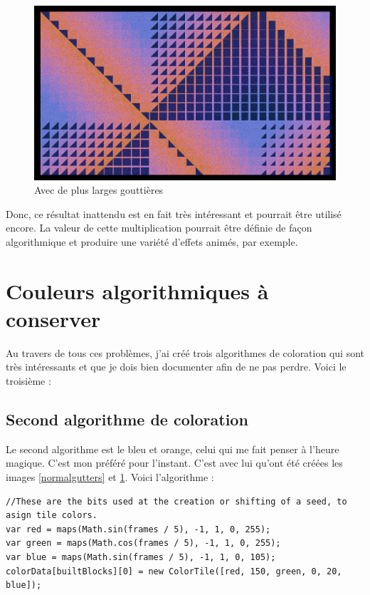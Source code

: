 \begin{figure}[h]
\includegraphics[width=1\textwidth]{images/pavage001.jpg}
\caption{Avec de plus larges gouttières}
\label{largegutters}
\end{figure}
Donc, ce résultat inattendu est en fait très intéressant et pourrait être utilisé encore. La valeur de cette multiplication pourrait être définie de façon algorithmique et produire une variété d'effets animés, par exemple.

\newpage
\section{Couleurs algorithmiques à conserver}
Au travers de tous ces problèmes, j'ai créé trois algorithmes de coloration qui sont très intéressants et que je dois bien documenter afin de ne pas perdre. Voici le troisième : 

\subsection{Second algorithme de coloration}
Le second algorithme est le bleu et orange, celui qui me fait penser à l'heure magique. C'est mon préféré pour l'instant. C'est avec lui qu'ont été créées les images \ref{normalgutters} et \ref{largegutters}. Voici l'algorithme : 
\begin{lstlisting}
//These are the bits used at the creation or shifting of a seed, to asign tile colors.
var red = maps(Math.sin(frames / 5), -1, 1, 0, 255);
var green = maps(Math.cos(frames / 5), -1, 1, 0, 255);
var blue = maps(Math.sin(frames / 5), -1, 1, 0, 105);
colorData[builtBlocks][0] = new ColorTile([red, 150, green, 0, 20, blue]);
\end{lstlisting}

